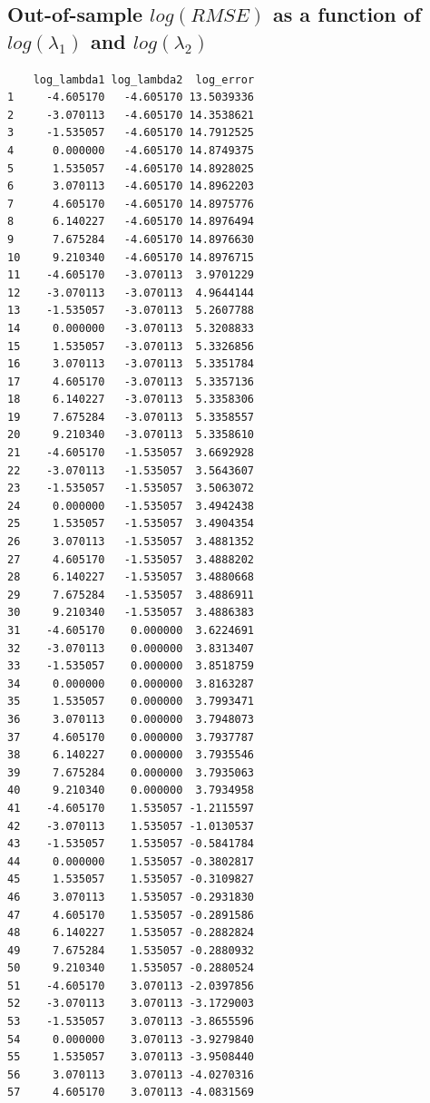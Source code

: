 \subsection{Out-of-sample $log(RMSE)$ as a function of $log(\lambda_1)$ and $log(\lambda_2)$}
\label{sec:cv_log_rmse}

\begin{verbatim}
    log_lambda1 log_lambda2  log_error
1     -4.605170   -4.605170 13.5039336
2     -3.070113   -4.605170 14.3538621
3     -1.535057   -4.605170 14.7912525
4      0.000000   -4.605170 14.8749375
5      1.535057   -4.605170 14.8928025
6      3.070113   -4.605170 14.8962203
7      4.605170   -4.605170 14.8975776
8      6.140227   -4.605170 14.8976494
9      7.675284   -4.605170 14.8976630
10     9.210340   -4.605170 14.8976715
11    -4.605170   -3.070113  3.9701229
12    -3.070113   -3.070113  4.9644144
13    -1.535057   -3.070113  5.2607788
14     0.000000   -3.070113  5.3208833
15     1.535057   -3.070113  5.3326856
16     3.070113   -3.070113  5.3351784
17     4.605170   -3.070113  5.3357136
18     6.140227   -3.070113  5.3358306
19     7.675284   -3.070113  5.3358557
20     9.210340   -3.070113  5.3358610
21    -4.605170   -1.535057  3.6692928
22    -3.070113   -1.535057  3.5643607
23    -1.535057   -1.535057  3.5063072
24     0.000000   -1.535057  3.4942438
25     1.535057   -1.535057  3.4904354
26     3.070113   -1.535057  3.4881352
27     4.605170   -1.535057  3.4888202
28     6.140227   -1.535057  3.4880668
29     7.675284   -1.535057  3.4886911
30     9.210340   -1.535057  3.4886383
31    -4.605170    0.000000  3.6224691
32    -3.070113    0.000000  3.8313407
33    -1.535057    0.000000  3.8518759
34     0.000000    0.000000  3.8163287
35     1.535057    0.000000  3.7993471
36     3.070113    0.000000  3.7948073
37     4.605170    0.000000  3.7937787
38     6.140227    0.000000  3.7935546
39     7.675284    0.000000  3.7935063
40     9.210340    0.000000  3.7934958
41    -4.605170    1.535057 -1.2115597
42    -3.070113    1.535057 -1.0130537
43    -1.535057    1.535057 -0.5841784
44     0.000000    1.535057 -0.3802817
45     1.535057    1.535057 -0.3109827
46     3.070113    1.535057 -0.2931830
47     4.605170    1.535057 -0.2891586
48     6.140227    1.535057 -0.2882824
49     7.675284    1.535057 -0.2880932
50     9.210340    1.535057 -0.2880524
51    -4.605170    3.070113 -2.0397856
52    -3.070113    3.070113 -3.1729003
53    -1.535057    3.070113 -3.8655596
54     0.000000    3.070113 -3.9279840
55     1.535057    3.070113 -3.9508440
56     3.070113    3.070113 -4.0270316
57     4.605170    3.070113 -4.0831569

\end{verbatim}
